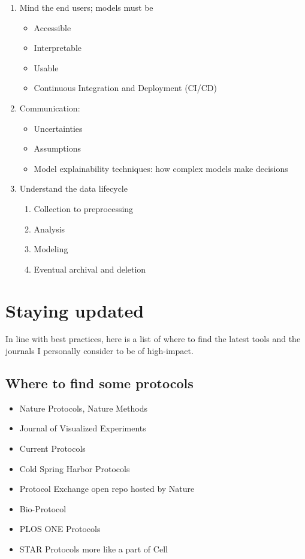 \documentclass[11pt]{report}
\begin{document}
{\begin{multicols}{2}
\begin{enumerate}
\begin{itemize}
			\item \textbf{Always be skeptical of results}
			\item Feedback from domain expertise
			\item Auditing 
		\end{itemize}
		\item Mind the end users; models must be 
		\begin{itemize}
			\item Accessible 
			\item Interpretable
			\item Usable 
			\item Continuous Integration and Deployment (CI/CD)
		\end{itemize}
		\item Communication:
		\begin{itemize}
			\item Uncertainties
			\item Assumptions
			\item Model explainability techniques: how complex models make decisions
			
		\end{itemize} 
	\item Understand the data lifecycle
		\begin{enumerate}
			\item Collection to preprocessing
			\item Analysis
			\item Modeling
			\item Eventual archival and deletion
		\end{enumerate}
	\end{enumerate}
	\end{multicols}


\section{Staying updated}
In line with best practices, here is a list of where to find the latest tools and the journals I personally consider to be of high-impact. 
\subsection{Where to find some protocols}
\begin{itemize}
	\item Nature Protocols, Nature Methods
	\item Journal of Visualized Experiments
	\item Current Protocols
	\item Cold Spring Harbor Protocols
	\item Protocol Exchange \dotfill open repo hosted by Nature
	\item Bio-Protocol
	\item PLOS ONE Protocols
	\item STAR Protocols \dotfill more like a part of Cell
\end{itemize}

}
\end{document}

